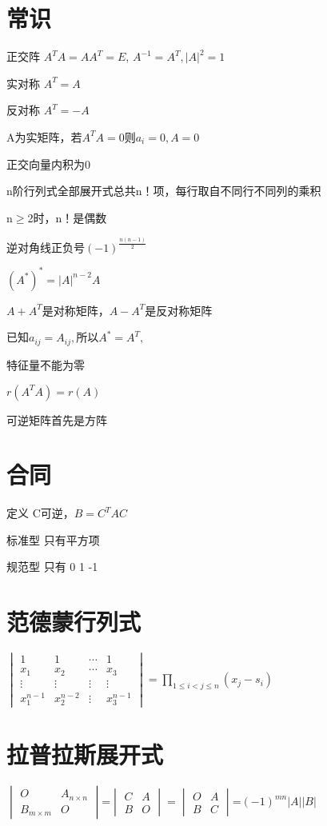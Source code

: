 \documentclass[UTF8]{ctexart}
\begin{document}
\section{常识}

正交阵 $A^{T}A=AA^{T}=E$, $A^{-1}=A^{T} , |A|^2 =1$


实对称 $A^{T}=A$

反对称 $A^{T}=-A$

A为实矩阵，若$A^{T}A=0\text{则}$$a_{i}=0,A=0$

正交向量内积为0

n阶行列式全部展开式总共n！项，每行取自不同行不同列的乘积

n$\geq$2时，n！是偶数

逆对角线正负号$(-1)^{\frac{n(n-1)}{2}}$

$(A^{*})^{*}=|A|^{n-2}A$

$A+A^{T}$是对称矩阵，$A-A^{T}$是反对称矩阵

已知$a_{ij}=A_{ij} , \mbox{所以} A^* =A^T ,$

特征量不能为零

$r(A^TA)=r(A)$

可逆矩阵首先是方阵


\section{合同}

定义 C可逆，$B=C^{T}AC$

标准型 只有平方项

规范型 只有 0 1 -1 

\section{范德蒙行列式}

$\begin{vmatrix}1 & 1 & \cdots & 1\\
x_{1} & x_{2} & \cdots & x_{3}\\
\vdots & \vdots & \vdots & \vdots\\
x_{1}^{n-1} & x_{2}^{n-2} & \vdots & x_{3}^{n-1}
\end{vmatrix}=\prod_{1\leq i<j\leq n}(x_{j}-s_{i})$

\section{拉普拉斯展开式}

$\begin{vmatrix}O & A_{n\times n}\\
B_{m\times m} & O
\end{vmatrix}$=$\begin{vmatrix}C & A\\
B & O
\end{vmatrix}=\begin{vmatrix}O & A\\
B & C
\end{vmatrix}$=$(-1)^{mn}|A||B|$
\end{document}
